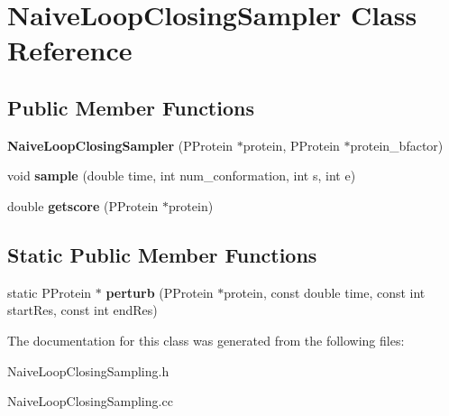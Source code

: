 \hypertarget{classNaiveLoopClosingSampler}{\section{Naive\-Loop\-Closing\-Sampler Class Reference}
\label{classNaiveLoopClosingSampler}
}
\subsection*{Public Member Functions}
\begin{DoxyCompactItemize}
\item 
\hypertarget{classNaiveLoopClosingSampler_a1062c1ff3040b6b1c617a9feafdd21c2}{{\bfseries Naive\-Loop\-Closing\-Sampler} (P\-Protein $\ast$protein, P\-Protein $\ast$protein\-\_\-bfactor)}\label{classNaiveLoopClosingSampler_a1062c1ff3040b6b1c617a9feafdd21c2}

\item 
\hypertarget{classNaiveLoopClosingSampler_a643d6d30002a48b51c7652bb0e22aa50}{void {\bfseries sample} (double time, int num\-\_\-conformation, int s, int e)}\label{classNaiveLoopClosingSampler_a643d6d30002a48b51c7652bb0e22aa50}

\item 
\hypertarget{classNaiveLoopClosingSampler_a7e9aa4024ff5c40b43e77f0fce1be60a}{double {\bfseries getscore} (P\-Protein $\ast$protein)}\label{classNaiveLoopClosingSampler_a7e9aa4024ff5c40b43e77f0fce1be60a}

\end{DoxyCompactItemize}
\subsection*{Static Public Member Functions}
\begin{DoxyCompactItemize}
\item 
\hypertarget{classNaiveLoopClosingSampler_ad409596c0254a122faf83d2ac925913e}{static P\-Protein $\ast$ {\bfseries perturb} (P\-Protein $\ast$protein, const double time, const int start\-Res, const int end\-Res)}\label{classNaiveLoopClosingSampler_ad409596c0254a122faf83d2ac925913e}

\end{DoxyCompactItemize}


The documentation for this class was generated from the following files\-:\begin{DoxyCompactItemize}
\item 
Naive\-Loop\-Closing\-Sampling.\-h\item 
Naive\-Loop\-Closing\-Sampling.\-cc\end{DoxyCompactItemize}
